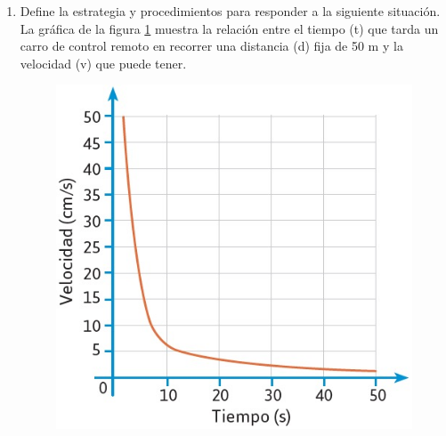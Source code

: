 \documentclass[11pt]{book}
\begin{document}
\begin{enumerate}
        \newpage
  \item Define la estrategia y procedimientos para responder a la siguiente situación.\\

        La gráfica de la figura \ref{fig:carro_control} muestra la relación entre el tiempo (t) que tarda un carro de control remoto en recorrer una distancia (d) fija de 50 m y la velocidad (v) que puede tener.
        \begin{minipage}[t]{0.45\linewidth}
          \begin{figure}[H]
            \centering
            \includegraphics[width=\linewidth]{carro_control.jpg}
            \label{fig:carro_control}
          \end{figure}%
          \begin{figure}[H]
            \centering

\end{figure}
\end{minipage}
\end{enumerate}
\end{document}

